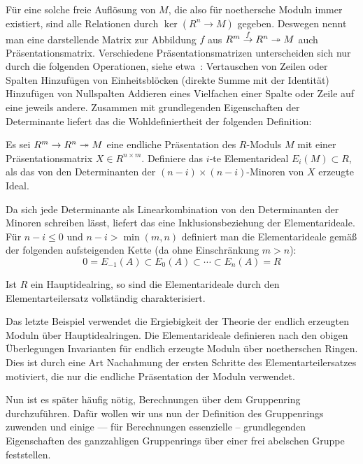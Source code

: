  Für eine solche freie Auflösung von $M$, die also für noethersche Moduln immer existiert, sind alle Relationen durch $\ker(R^n\to M)$ gegeben. Deswegen nennt man eine darstellende Matrix zur Abbildung $f$ aus $R^m \stackrel f \to R^n \twoheadrightarrow M$ auch Präsentationsmatrix. Verschiedene Präsentationsmatrizen unterscheiden sich nur durch die folgenden Operationen, siehe etwa~\cite[Theorem~6.1]{LickorishW.B.Raymond.1997}:
	\textbullet Vertauschen von Zeilen oder Spalten \textbullet Hinzufügen von Einheitsblöcken (direkte Summe mit der Identität) \textbullet Hinzufügen von Nullspalten \textbullet Addieren eines Vielfachen einer Spalte oder Zeile auf eine jeweils andere. Zusammen mit grundlegenden Eigenschaften der Determinante liefert das die Wohldefiniertheit der folgenden Definition:
	\begin{defn}
	Es sei $R^m \to R^n \twoheadrightarrow M$ eine endliche Präsentation des $R$-Moduls $M$ mit einer Präsentationsmatrix $X \in R^{n \times m}$. Definiere das $i$-te Elementarideal $E_i(M) \subset R$, als das von den Determinanten der $(n-i)\times (n-i)$-Minoren von $X$ erzeugte Ideal.
    	\end{defn}

        Da sich jede Determinante als Linearkombination von den Determinanten der Minoren schreiben lässt, liefert das eine Inklusionsbeziehung der Elementarideale. Für $n-i\leq 0$ und $n-i > \min(m,n)$ definiert man die Elementarideale gemäß der folgenden aufsteigenden Kette (da ohne Einschränkung $m>n$):
        \[
             0=E_{-1}(A)\subset E_0(A) \subset \cdots \subset E_n(A) = R
         \] 

        \begin{bsp}
        \label{bsp:hauptidealelementarteiler}
            Ist $R$ ein Hauptidealring, so sind die Elementarideale durch den Elementarteilersatz vollständig charakterisiert.
        \end{bsp}
        \begin{bem}
        	Das letzte Beispiel verwendet die Ergiebigkeit der Theorie der endlich erzeugten Moduln über Hauptidealringen. Die Elementarideale definieren nach den obigen Überlegungen Invarianten für endlich erzeugte Moduln über noetherschen Ringen. Dies ist durch eine Art Nachahmung der ersten Schritte des Elementarteilersatzes motiviert, die nur die endliche Präsentation der Moduln verwendet.
        \end{bem}

    Nun ist es später häufig nötig, Berechnungen über dem Gruppenring durchzuführen. Dafür wollen wir uns nun der Definition des Gruppenrings zuwenden und einige --- für Berechnungen essenzielle -- grundlegenden Eigenschaften des ganzzahligen Gruppenrings über einer frei abelschen Gruppe feststellen.

